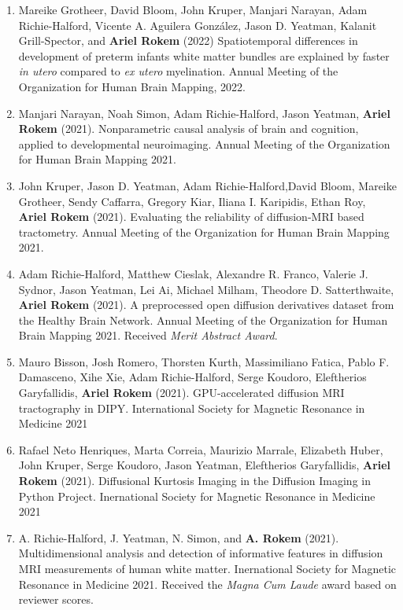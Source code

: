 \documentclass[11pt,fullpage]{article}
\begin{document}
\begin{enumerate}
\item Mareike Grotheer, David Bloom, John Kruper, Manjari Narayan, Adam Richie-Halford, Vicente A. Aguilera González, Jason D. Yeatman, Kalanit Grill-Spector, and {\bf Ariel Rokem} (2022) Spatiotemporal differences in development of preterm infants white matter bundles are explained by faster \emph{in utero} compared to \emph{ex utero} myelination. Annual Meeting of the Organization for Human Brain Mapping, 2022.

\item Manjari Narayan, Noah Simon, Adam Richie-Halford, Jason Yeatman, {\bf Ariel Rokem} (2021). Nonparametric causal analysis of brain and cognition, applied to developmental neuroimaging. Annual Meeting of the Organization for Human Brain Mapping 2021.

\item John Kruper, Jason D. Yeatman, Adam Richie-Halford,David Bloom, Mareike Grotheer, Sendy Caffarra, Gregory Kiar, Iliana I. Karipidis, Ethan Roy, {\bf Ariel Rokem} (2021). Evaluating the reliability of diffusion-MRI based tractometry. Annual Meeting of the Organization for Human Brain Mapping 2021.

\item Adam Richie-Halford, Matthew Cieslak, Alexandre R. Franco, Valerie J. Sydnor, Jason Yeatman, Lei Ai, Michael Milham, Theodore D. Satterthwaite, {\bf Ariel Rokem} (2021). A preprocessed open diffusion derivatives dataset from the Healthy Brain Network. Annual Meeting of the Organization for Human Brain Mapping 2021. Received \emph{Merit Abstract Award}.

\item Mauro Bisson, Josh Romero, Thorsten Kurth, Massimiliano Fatica, Pablo F. Damasceno, Xihe Xie, Adam Richie-Halford, Serge Koudoro, Eleftherios Garyfallidis, {\bf Ariel Rokem} (2021). GPU-accelerated diffusion MRI tractography in DIPY. International Society for Magnetic Resonance in Medicine 2021

\item Rafael Neto Henriques, Marta Correia, Maurizio Marrale, Elizabeth Huber, John Kruper, Serge Koudoro, Jason Yeatman, Eleftherios Garyfallidis, {\bf Ariel Rokem} (2021). Diffusional Kurtosis Imaging in the Diffusion Imaging in Python Project. Inernational Society for Magnetic Resonance in Medicine 2021

\item A. Richie-Halford, J. Yeatman, N. Simon, and {\bf A. Rokem} (2021). Multidimensional analysis and detection of informative features in diffusion MRI measurements of human white matter. Inernational Society for Magnetic Resonance in Medicine 2021. Received the \emph{Magna Cum Laude} award based on reviewer scores.


\end{enumerate}
\end{document}
